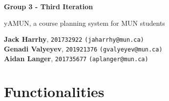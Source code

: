 \documentclass[12pt]{article}
\begin{document}
\begin{titlepage}
    \begin{center}
        \vspace*{1cm}
            
        \Huge
        \textbf{Group 3 - Third Iteration}
            
        \vspace{0.5cm}
        \LARGE
        yAMUN, a course planning system for MUN students
            
        \vspace{1.5cm}
            
        \textbf{Jack Harrhy}, \texttt{201732922} \texttt{(jaharrhy@mun.ca)} \\
        \textbf{Genadi Valyeyev}, \texttt{201921376} \texttt{(gvalyeyev@mun.ca)}\\
        \textbf{Aidan Langer}, \texttt{201735677} \texttt{(aplanger@mun.ca)}\\
            
        \vfill
    \end{center}
\end{titlepage}

\section{Functionalities}
\end{document}

